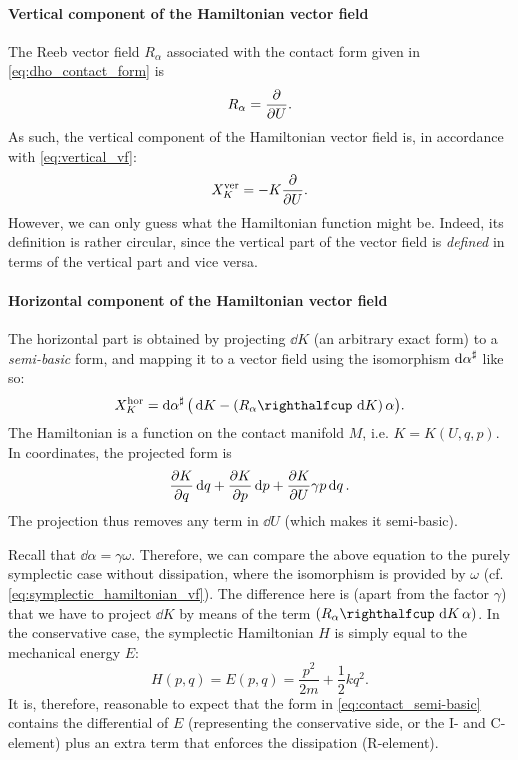 \paragraph{Vertical component of the Hamiltonian vector field} The Reeb vector field \(R_\alpha\) associated with the contact form given in \cref{eq:dho_contact_form} is 
\begin{equation}
     R_\alpha = \pdv{}{U}.
\end{equation}
As such, the vertical component of the Hamiltonian vector field is, in accordance with \cref{eq:vertical_vf}:
\begin{equation}
    X_K^\text{ver} = -K\pdv{}{U}.
    \label{eq:dho_vertical}
\end{equation}
However, we can only guess what the Hamiltonian function might be. Indeed, its definition is rather circular, since the vertical part of the vector field is \emph{defined} in terms of the vertical part and vice versa.

\paragraph{Horizontal component of the Hamiltonian vector field} The horizontal part is obtained by projecting \(\dd{K}\) (an arbitrary exact form) to a \emph{semi-basic} form, and mapping it to a vector field using the isomorphism \(\dd{\alpha}^\sharp\) like so:
\begin{equation}
     X_K^\text{hor} = \fromDual{\dd{\alpha}}\big(\dd{K} - \qty(\intpr{R_\alpha}{\dd{K}})\,\alpha\big).
\end{equation}
The Hamiltonian is a function on the contact manifold \(M\), i.e. \(K = K(U, q, p)\). In coordinates, the projected form is
\begin{equation}
    \pdv{K}{q}\dd{q} + \pdv{K}{p}\dd{p} + \pdv{K}{U} \gamma p \dd{q}.
    \label{eq:contact_semi-basic}
\end{equation}
The projection thus removes any term in \(\dd{U}\) (which makes it semi-basic).

Recall that \(\dd{\alpha} = \gamma \omega \). Therefore, we can compare the above equation to the purely symplectic case without dissipation, where the isomorphism is provided by \(\omega\) (cf. \cref{eq:symplectic_hamiltonian_vf}). The difference here is (apart from the factor \(\gamma\)) that we have to project \(\dd{K}\) by means of the term \(\qty(\intpr{R_\alpha}{\dd{K}}\alpha)\). In the conservative case, the symplectic Hamiltonian $H$ is simply equal to the mechanical energy $E$:
\begin{equation}
    H(p, q) = E(p, q) = \frac{p^2}{2m} + \frac{1}{2}kq^2.
\end{equation}
It is, therefore, reasonable to expect that the form in \cref{eq:contact_semi-basic} contains the differential of \(E\) (representing the conservative side, or the I- and C-element) plus an extra term that enforces the dissipation (R-element). 

